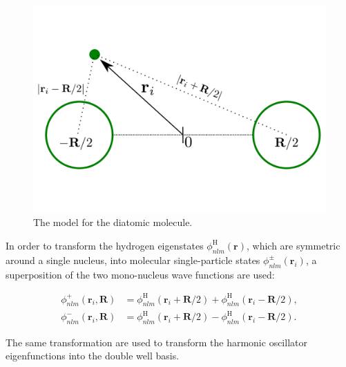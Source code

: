 \begin{frame}
 \begin{figure}
 \begin{center}
  \includegraphics[scale=0.3]{../graphics/Molecules.pdf}
  \caption{The model for the diatomic molecule.}
 \end{center}
\end{figure}
\end{frame}

\begin{frame}
 In order to transform the hydrogen eigenstates $\phi_{nlm}^\mathrm{H}(\mathbf{r})$, which are symmetric around a single nucleus, into molecular single-particle states $\phi_{nlm}^\pm (\mathbf{r}_i)$, a superposition of the two mono-nucleus wave functions are used:

\begin{align*}
 \phi_{nlm}^+ (\mathbf{r}_i, \mathbf{R}) &= \phi_{nlm}^\mathrm{H}(\mathbf{r}_i + \mathbf{R}/2) + \phi_{nlm}^\mathrm{H}(\mathbf{r}_i - \mathbf{R}/2)\label{eq:moleculeTransPlus}, \\
 \phi_{nlm}^- (\mathbf{r}_i, \mathbf{R}) &= \phi_{nlm}^\mathrm{H}(\mathbf{r}_i + \mathbf{R}/2) - \phi_{nlm}^\mathrm{H}(\mathbf{r}_i - \mathbf{R}/2)\label{eq:moleculeTransMin}.
\end{align*}
\shift 

The same transformation are used to transform the harmonic oscillator eigenfunctions into the double well basis.

\end{frame}









